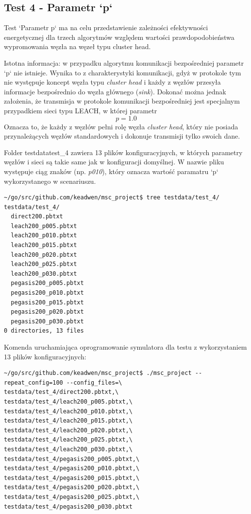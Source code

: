 \documentclass[a4paper,12pt,twoside,openany]{report}
\begin{document}
\subsection{Test 4 - Parametr `p`}

Test `Parametr p` ma na celu przedstawienie zależności efektywności energetycznej dla trzech algorytmów względem wartości prawdopodobieństwa wypromowania węzła na węzeł
typu cluster head. 

Istotna informacja: w przypadku algorytmu komunikacji bezpośredniej parametr `p` nie istnieje. Wynika to z charakterystyki komunikacji, gdyż w protokole
tym nie występuje koncept węzła typu \textit{cluster head} i każdy z węzłów przesyła informacje bezpośrednio do węzła głównego (\textit{sink}). Dokonać można jednak założenia, że 
transmisja w protokole komunikacji bezpośredniej jest specjalnym przypadkiem sieci typu LEACH, w której parametr \[ p = 1.0 \]
Oznacza to, że każdy z węzłów pełni rolę węzła \textit{cluster head}, który nie posiada przynależących węzłów standardowych i dokonuje transmisji tylko swoich dane.

Folder testdata\/test\_4 zawiera 13 plików konfiguracyjnych, w których parametry węzłów i sieci są takie same jak w konfiguracji domyślnej.
W nazwie pliku występuje ciąg znaków (np. \textit{p010}), który oznacza wartość paramatru `p` wykorzystanego w scenariuszu.

\begin{lstlisting}
~/go/src/github.com/keadwen/msc_project$ tree testdata/test_4/
testdata/test_4/
  direct200.pbtxt
  leach200_p005.pbtxt
  leach200_p010.pbtxt
  leach200_p015.pbtxt
  leach200_p020.pbtxt
  leach200_p025.pbtxt
  leach200_p030.pbtxt
  pegasis200_p005.pbtxt
  pegasis200_p010.pbtxt
  pegasis200_p015.pbtxt
  pegasis200_p020.pbtxt
  pegasis200_p030.pbtxt
0 directories, 13 files
\end{lstlisting}

Komenda uruchamiająca oprogramowanie symulatora dla testu z wykorzystaniem 13 plików konfiguracyjnych:

\begin{lstlisting}
~/go/src/github.com/keadwen/msc_project$ ./msc_project --repeat_config=100 --config_files=\
testdata/test_4/direct200.pbtxt,\
testdata/test_4/leach200_p005.pbtxt,\
testdata/test_4/leach200_p010.pbtxt,\
testdata/test_4/leach200_p015.pbtxt,\
testdata/test_4/leach200_p020.pbtxt,\
testdata/test_4/leach200_p025.pbtxt,\
testdata/test_4/leach200_p030.pbtxt,\
testdata/test_4/pegasis200_p005.pbtxt,\
testdata/test_4/pegasis200_p010.pbtxt,\
testdata/test_4/pegasis200_p015.pbtxt,\
testdata/test_4/pegasis200_p020.pbtxt,\
testdata/test_4/pegasis200_p025.pbtxt,\
testdata/test_4/pegasis200_p030.pbtxt
\end{lstlisting}
\end{document}
